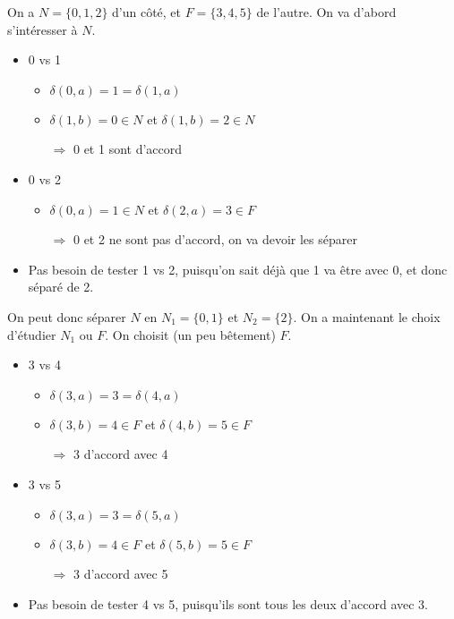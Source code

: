 \begin{correction*}

On a $N = \{0,1,2\}$ d'un côté, et $F = \{3,4,5\}$ de l'autre. On va d'abord s'intéresser à $N$.

\begin{itemize}
\item 0 vs 1
\begin{itemize}
\item $\delta(0,a) = 1 = \delta(1,a)$
\item $\delta(1,b) = 0 \in N$ et $\delta(1,b) = 2 \in N$
\item[$\Rightarrow$] 0 et 1 sont d'accord
\end{itemize}
\item 0 vs 2
\begin{itemize}
\item $\delta(0,a) = 1 \in N$ et $\delta(2,a) = 3 \in F$
\item[$\Rightarrow$] 0 et 2 ne sont pas d'accord, on va devoir les séparer
\end{itemize}
\item Pas besoin de tester 1 vs 2, puisqu'on sait déjà que 1 va être avec 0, et donc séparé de 2.
\end{itemize}

On peut donc séparer $N$ en $N_1 = \{0,1\}$ et $N_2 = \{2\}$. On a maintenant le choix d'étudier $N_1$ ou $F$. On choisit (un peu bêtement) $F$.

\begin{itemize}
\item 3 vs 4
\begin{itemize}
\item $\delta(3,a) = 3 = \delta(4,a)$
\item $\delta(3,b) = 4 \in F$ et $\delta(4,b) = 5 \in F$
\item[$\Rightarrow$] 3 d'accord avec 4
\end{itemize}
\item 3 vs 5
\begin{itemize}
\item $\delta(3,a) = 3 = \delta(5,a)$
\item $\delta(3,b) = 4 \in F$ et $\delta(5,b) = 5 \in F$
\item[$\Rightarrow$] 3 d'accord avec 5
\end{itemize}
\item Pas besoin de tester 4 vs 5, puisqu'ils sont tous les deux d'accord avec 3.
\end{itemize}


\end{correction*}
